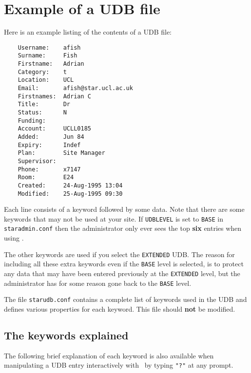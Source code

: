 \section{Example of a UDB file}

Here is an example listing of the contents of a UDB file:

\begin{verbatim}
    Username:    afish
    Surname:     Fish
    Firstname:   Adrian
    Category:    t
    Location:    UCL
    Email:       afish@star.ucl.ac.uk
    Firstnames:  Adrian C
    Title:       Dr
    Status:      N
    Funding:
    Account:     UCLL0185
    Added:       Jun 84
    Expiry:      Indef
    Plan:        Site Manager
    Supervisor:
    Phone:       x7147
    Room:        E24
    Created:     24-Aug-1995 13:04
    Modified:    25-Aug-1995 09:30
\end{verbatim}

Each line consists of a keyword followed by some data.
Note that there are some keywords that may not be used at your site.
If {\tt UDBLEVEL} is set to {\tt BASE} in {\tt staradmin.conf} then
the administrator only ever sees the top {\bf six} entries when using
\staradmin.

The other keywords are used if you select the {\tt EXTENDED} UDB.
The reason for including all these extra keywords even if the {\tt BASE}
level is selected, is to protect any data that may have been entered
previously at the {\tt EXTENDED} level, but the administrator has for some
reason gone back to the {\tt BASE} level.

The file {\tt starudb.conf} contains a complete list of keywords used in the
UDB and defines various properties for each keyword. This file should
{\bf not} be modified.

\subsection{The keywords explained}

The following brief explanation of each keyword is also available when
manipulating a UDB entry interactively with \staradmin\ by typing {\tt "?"} at
any prompt.

